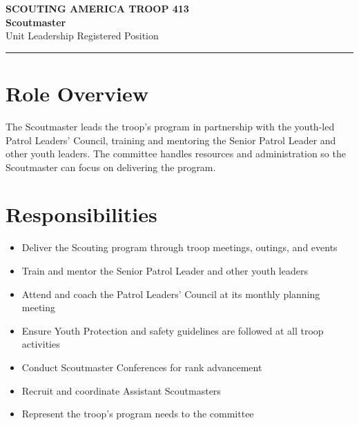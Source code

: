 \documentclass[11pt, letterpaper]{article}
\begin{document}
\begin{center}
  {\small\color{scoutgreen}\textbf{SCOUTING AMERICA \textbullet{} TROOP 413}} \\[4pt]
  {\fontsize{20pt}{24pt}\selectfont\bfseries\color{scoutgreen} Scoutmaster} \\[4pt]
  {\large\color{accent} Unit Leadership \textbullet{} Registered Position} \\[4pt]
  \textcolor{accent}{\rule{0.6\linewidth}{1pt}}
\end{center}

\vspace{0.2em}

\begin{minipage}[t]{0.48\linewidth}
\raggedright

\section{Role Overview}
The Scoutmaster leads the troop's program in partnership with the youth-led Patrol Leaders' Council, training and mentoring the Senior Patrol Leader and other youth leaders. The committee handles resources and administration so the Scoutmaster can focus on delivering the program.

\vspace{0.3em}
\section{Responsibilities}
\begin{itemize}
  \item Deliver the Scouting program through troop meetings, outings, and events
  \item Train and mentor the Senior Patrol Leader and other youth leaders
  \item Attend and coach the Patrol Leaders' Council at its monthly planning meeting
  \item Ensure Youth Protection and safety guidelines are followed at all troop activities
  \item Conduct Scoutmaster Conferences for rank advancement
  \item Recruit and coordinate Assistant Scoutmasters
  \item Represent the troop's program needs to the committee
\end{itemize}


\end{minipage}
\end{document}
